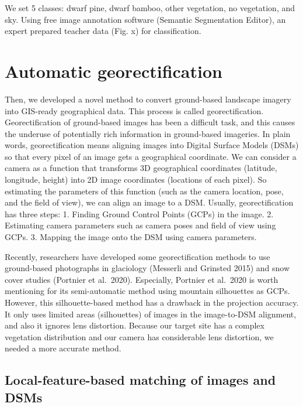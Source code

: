 \documentclass{article}
\begin{document}
We set 5 classes: dwarf pine, dwarf bamboo, other vegetation, no
vegetation, and sky. Using free image annotation software (Semantic
Segmentation Editor), an expert prepared teacher data (Fig. x) for
classification.

\hypertarget{automatic-georectification}{%
\section{Automatic georectification}\label{automatic-georectification}}

Then, we developed a novel method to convert ground-based landscape
imagery into GIS-ready geographical data. This process is called
georectification. Georectification of ground-based images has been a
difficult task, and this causes the underuse of potentially rich
information in ground-based imageries. In plain words, georectification
means aligning images into Digital Surface Models (DSMs) so that every
pixel of an image gets a geographical coordinate. We can consider a
camera as a function that transforms 3D geographical coordinates
(latitude, longitude, height) into 2D image coordinates (locations of
each pixel). So estimating the parameters of this function (such as the
camera location, pose, and the field of view), we can align an image to
a DSM. Usually, georectification has three steps: 1. Finding Ground
Control Points (GCPs) in the image. 2. Estimating camera parameters such
as camera poses and field of view using GCPs. 3. Mapping the image onto
the DSM using camera parameters.

Recently, researchers have developed some georectification methods to
use ground-based photographs in glaciology (Messerli and Grinsted 2015)
and snow cover studies (Portnier et al.~2020). Especially, Portnier et
al.~2020 is worth mentioning for its semi-automatic method using
mountain silhouettes as GCPs. However, this silhouette-based method has
a drawback in the projection accuracy. It only uses limited areas
(silhouettes) of images in the image-to-DSM alignment, and also it
ignores lens distortion. Because our target site has a complex
vegetation distribution and our camera has considerable lens distortion,
we needed a more accurate method.

\hypertarget{local-feature-based-matching-of-images-and-dsms}{%
\subsection{Local-feature-based matching of images and
DSMs}\label{local-feature-based-matching-of-images-and-dsms}}
\end{document}
